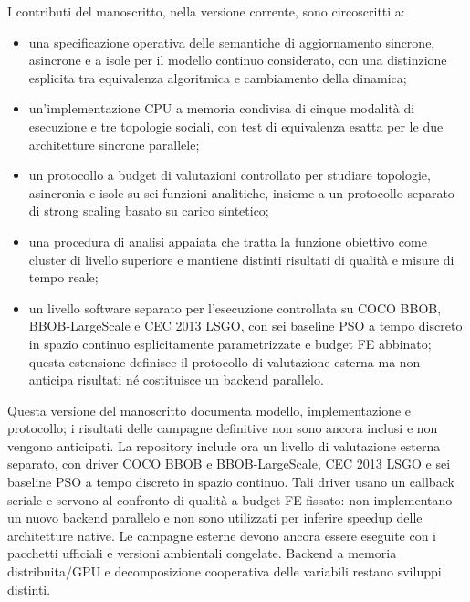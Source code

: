 I contributi del manoscritto, nella versione corrente, sono circoscritti a:
\begin{itemize}
  \item una specificazione operativa delle semantiche di aggiornamento sincrone, asincrone e a isole per il modello continuo considerato, con una distinzione esplicita tra equivalenza algoritmica e cambiamento della dinamica;
  \item un'implementazione CPU a memoria condivisa di cinque modalità di esecuzione e tre topologie sociali, con test di equivalenza esatta per le due architetture sincrone parallele;
  \item un protocollo a budget di valutazioni controllato per studiare topologie, asincronia e isole su sei funzioni analitiche, insieme a un protocollo separato di strong scaling basato su carico sintetico;
  \item una procedura di analisi appaiata che tratta la funzione obiettivo come cluster di livello superiore e mantiene distinti risultati di qualità e misure di tempo reale;
  \item un livello software separato per l'esecuzione controllata su COCO BBOB, BBOB-LargeScale e CEC 2013 LSGO, con sei baseline PSO a tempo discreto in spazio continuo esplicitamente parametrizzate e budget FE abbinato; questa estensione definisce il protocollo di valutazione esterna ma non anticipa risultati né costituisce un backend parallelo.
\end{itemize}

Questa versione del manoscritto documenta modello, implementazione e protocollo; i risultati delle campagne definitive non sono ancora inclusi e non vengono anticipati. La repository include ora un livello di valutazione esterna separato, con driver COCO BBOB e BBOB-LargeScale, CEC 2013 LSGO e sei baseline PSO a tempo discreto in spazio continuo. Tali driver usano un callback seriale e servono al confronto di qualità a budget FE fissato: non implementano un nuovo backend parallelo e non sono utilizzati per inferire speedup delle architetture native. Le campagne esterne devono ancora essere eseguite con i pacchetti ufficiali e versioni ambientali congelate. Backend a memoria distribuita/GPU e decomposizione cooperativa delle variabili restano sviluppi distinti.
